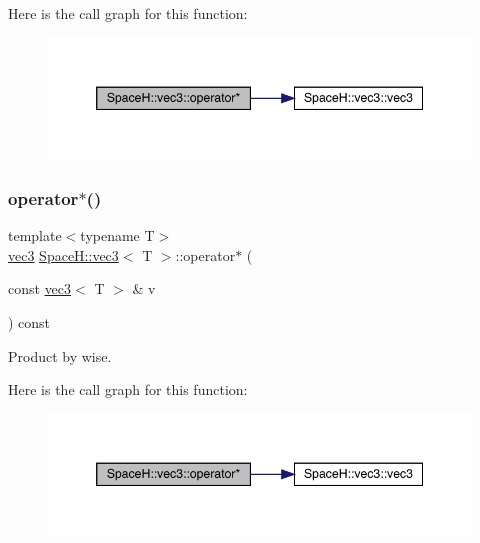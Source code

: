 Here is the call graph for this function\+:
\nopagebreak
\begin{figure}[H]
\begin{center}
\leavevmode
\includegraphics[width=346pt]{struct_space_h_1_1vec3_a5399298171d5e12e7b76ade00ab7d67d_cgraph}
\end{center}
\end{figure}
\mbox{\label{struct_space_h_1_1vec3_a5399298171d5e12e7b76ade00ab7d67d}} 
\subsubsection{\texorpdfstring{operator$\ast$()}{operator*()}\hspace{0.1cm}{\footnotesize\ttfamily [2/7]}}
{\footnotesize\ttfamily template$<$typename T$>$ \\
\mbox{\hyperlink{struct_space_h_1_1vec3}{vec3}} \mbox{\hyperlink{struct_space_h_1_1vec3}{Space\+H\+::vec3}}$<$ T $>$\+::operator$\ast$ (\begin{DoxyParamCaption}\item[{const \mbox{\hyperlink{struct_space_h_1_1vec3}{vec3}}$<$ T $>$ \&}]{v }\end{DoxyParamCaption}) const\hspace{0.3cm}{\ttfamily [inline]}}



Product by wise. 

Here is the call graph for this function\+:
\nopagebreak
\begin{figure}[H]
\begin{center}
\leavevmode
\includegraphics[width=346pt]{struct_space_h_1_1vec3_a5399298171d5e12e7b76ade00ab7d67d_cgraph}
\end{center}
\end{figure}
\mbox{\label{struct_space_h_1_1vec3_a5399298171d5e12e7b76ade00ab7d67d}} 
